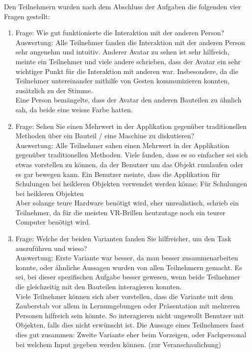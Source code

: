 \pagebreak
Den Teilnehmern wurden nach dem Abschluss der Aufgaben die folgenden vier Fragen gestellt:

\begin{enumerate} [itemsep=1pt,topsep=0pt]
	\item Frage: Wie gut funktionierte die Interaktion mit der anderen Person? \\
	Auswertung: Alle Teilnehmer fanden die Interaktion mit der anderen Person sehr angenehm und intuitiv. \grqq Anderer Avatar zu sehen ist sehr hilfreich\grqq{}, meinte ein Teilnehmer und viele andere schrieben, dass der Avatar ein sehr wichtiger Punkt für die Interaktion mit anderen war. Insbesondere, da die Teilnehmer untereinander mithilfe von Gesten kommunizieren konnten, zusätzlich zu der Stimme.  \\
	Eine Person bemängelte, dass der Avatar den anderen Bauteilen zu ähnlich sah, da beide eine weisse Farbe hatten.
	\item Frage: Sehen Sie einen Mehrwert in der Applikation gegenüber traditionellen Methoden über ein Bauteil / eine Maschine zu diskutieren? \\
	Auswertung: Alle Teilnehmer sahen einen Mehrwert in der Applikation gegenüber traditionellen Methoden. Viele fanden, dass es so einfacher sei sich etwas vorstellen zu können, da der Benutzer um das Objekt rumlaufen oder es gar bewegen kann. Ein Benutzer meinte, dass die Applikation für Schulungen bei heikleren Objekten verwendet werden könne: \grqq Für Schulungen bei heikleren Objekten\grqq{}\\
	\grqq Aber solange teure Hardware benötigt wird, eher unrealistisch\grqq{}, schrieb ein Teilnehmer, da für die meisten VR-Brillen heutzutage noch ein teurer Computer benötigt wird.

	\item Frage: Welche der beiden Varianten fanden Sie hilfreicher, um den Task auszuführen und wieso? \\
	Auswertung: \grqq Erste Variante war besser, da man besser zusammenarbeiten konnte\grqq{}, oder ähnliche Aussagen wurden von allen Teilnehmern gemacht. Es sei, bei dieser spezifischen Aufgabe besser gewesen, wenn beide Teilnehmer die gleichzeitig mit den Bauteilen interagieren konnten.\\
	Viele Teilnehmer können sich aber vorstellen, dass die Variante mit dem Zauberstab vor allem in Lernumgebungen oder Präsentation mit mehreren Personen hilfreich sein könnte. So interagieren nicht ungewollt Benutzer mit Objekten, falls dies nicht erwünscht ist. Die Aussage eines Teilnehmers fasst dies gut zusammen: \grqq Zweite Variante eher beim Vorzeigen, oder Fachpersonal bei welchem Input gegeben werden können. (zur Veranschaulichung)\grqq{} 
	

\end{enumerate}

